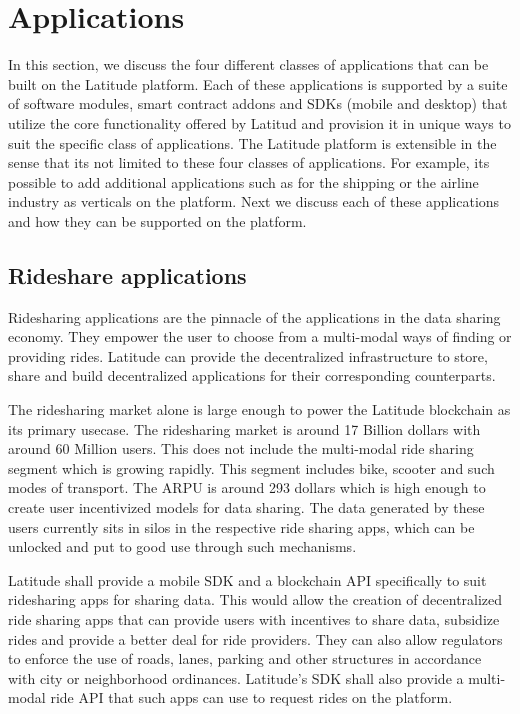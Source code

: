 
\noindent
\section{Applications}
\label{sec:apps}

In this section, we discuss the four different classes of applications that can be built on the Latitude platform. Each
of these applications is supported by a suite of software modules, smart contract addons and SDKs (mobile and desktop)
that utilize the core functionality offered by Latitud and provision it in unique ways to suit the specific class of
applications. The Latitude platform is extensible in the sense that its not limited to these four classes of
applications. For example, its possible to add additional applications such as for the shipping or the airline industry
as verticals on the platform. Next we discuss each of these applications and how they can be supported on the platform.

\noindent
\subsection{Rideshare applications}

Ridesharing applications are the pinnacle of the applications in the data sharing economy. They empower the user to
choose from a multi-modal ways of finding or providing rides. Latitude can provide the decentralized infrastructure to
store, share and build decentralized applications for their corresponding counterparts.

The ridesharing market alone is large enough to power the Latitude blockchain as its primary usecase. The ridesharing
market is around 17 Billion dollars with around 60 Million users. This does not include the multi-modal ride sharing
segment which is growing rapidly. This segment includes bike, scooter and such modes of transport. The ARPU is around 
293 dollars which is high enough to create user incentivized models for data sharing. The data generated by these users
currently sits in silos in the respective ride sharing apps, which can be unlocked and put to good use through such
mechanisms. 

Latitude shall provide a mobile SDK and a blockchain API specifically to suit ridesharing apps for sharing data. This
would allow the creation of decentralized ride sharing apps that can provide users with incentives to share data,
subsidize rides and provide a better deal for ride providers. They can also allow regulators to enforce the use of
roads, lanes, parking and other structures in accordance with city or neighborhood ordinances. Latitude's SDK shall also
provide a multi-modal ride API that such apps can use to request rides on the platform.

